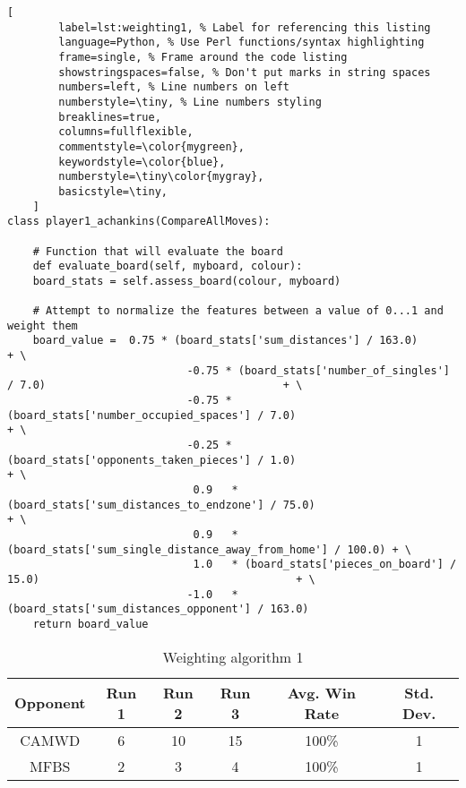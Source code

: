 \documentclass[
	12pt, %
]{fphw}
\begin{document}
\begin{lstlisting}[
		label=lst:weighting1, % Label for referencing this listing
		language=Python, % Use Perl functions/syntax highlighting
		frame=single, % Frame around the code listing
		showstringspaces=false, % Don't put marks in string spaces
		numbers=left, % Line numbers on left
		numberstyle=\tiny, % Line numbers styling
		breaklines=true,
		columns=fullflexible,
		commentstyle=\color{mygreen},
		keywordstyle=\color{blue},
		numberstyle=\tiny\color{mygray},
		basicstyle=\tiny,
	]
class player1_achankins(CompareAllMoves):

    # Function that will evaluate the board
    def evaluate_board(self, myboard, colour):
    board_stats = self.assess_board(colour, myboard)

    # Attempt to normalize the features between a value of 0...1 and weight them
    board_value =  0.75 * (board_stats['sum_distances'] / 163.0)                                        + \
                            -0.75 * (board_stats['number_of_singles'] / 7.0)                                     + \
                            -0.75 * (board_stats['number_occupied_spaces'] / 7.0)                          + \
                            -0.25 * (board_stats['opponents_taken_pieces'] / 1.0)                            + \
                             0.9   * (board_stats['sum_distances_to_endzone'] / 75.0)                      + \
                             0.9   * (board_stats['sum_single_distance_away_from_home'] / 100.0) + \
                             1.0   * (board_stats['pieces_on_board'] / 15.0)                                        + \
                            -1.0   * (board_stats['sum_distances_opponent'] / 163.0)
    return board_value

\end{lstlisting}

\begin{table}[H]
	\centering
	\begin{tabular}{||c | c c c c c||}
		\hline
		Opponent & Run 1&   Run 2 & Run 3 & Avg. Win Rate & Std. Dev. \\ [0.5ex]
		\hline\hline
		CAMWD &  6 & 10 & 15 & 100\% & 1 \\
		\hline
		MFBS & 2 & 3 & 4 & 100\% & 1 \\ [1ex]
		\hline
	\end{tabular}
	\caption{Weighting algorithm 1}
	\label{table:1}
\end{table}

\end{document}
